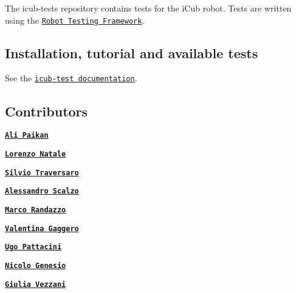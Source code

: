 

The {\ttfamily icub-\/tests} repository contains tests for the i\+Cub robot. Tests are written using the \href{https://github.com/robotology/robot-testing-framework}{\tt Robot Testing Framework}.

\subsection*{Installation, tutorial and available tests}

See the \href{https://robotology.github.io/icub-tests/}{\tt icub-\/test documentation}.

\subsection*{Contributors}


\begin{DoxyItemize}
\item \href{https://github.com/apaikan}{\tt {\bfseries Ali Paikan}}
\item \href{https://github.com/lornat75}{\tt {\bfseries Lorenzo Natale}}
\item \href{https://github.com/traversaro}{\tt {\bfseries Silvio Traversaro}}
\item \href{https://github.com/ale-git}{\tt {\bfseries Alessandro Scalzo}}
\item \href{https://github.com/randaz81}{\tt {\bfseries Marco Randazzo}}
\item \href{https://github.com/valegagge}{\tt {\bfseries Valentina Gaggero}}
\item \href{https://github.com/pattacini}{\tt {\bfseries Ugo Pattacini}}
\item \href{https://github.com/Nicogene}{\tt {\bfseries Nicolo\textquotesingle{} Genesio}}
\item \href{https://github.com/giuliavezzani}{\tt {\bfseries Giulia Vezzani}} 
\end{DoxyItemize}